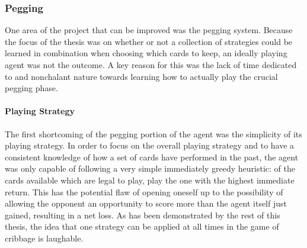
\subsubsection*{Pegging}
\label{sec:disc-future-pegging}



One area of the project that can be improved was the pegging system.
%
Because the focus of the thesis was on whether or not a collection of
strategies could be learned in combination when choosing which cards to keep,
an ideally playing agent was not the outcome.
%
A key reason for this was the lack of time dedicated to and nonchalant nature
towards learning how to actually play the crucial pegging phase.

\paragraph*{Playing Strategy}


The first shortcoming of the pegging portion of the agent was the simplicity
of its playing strategy.
%
In order to focus on the overall playing strategy and to have a consistent
knowledge of how a set of cards have performed in the past,
the agent was only capable of following a very simple immediately greedy 
heuristic:
of the cards available which are legal to play,
play the one with the highest immediate return.
%
This has the potential flaw of
opening oneself up to the possibility of allowing the opponent an opportunity
to score more than the agent itself just gained,
resulting in a net loss.
%
As has been demonstrated by the rest of this thesis,
the idea that one strategy can be applied at all times in the game of cribbage
is laughable.

